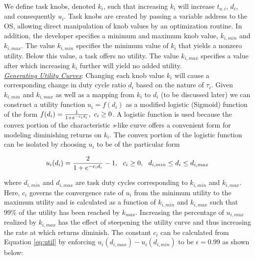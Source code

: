We define task knobs, denoted $k_i$, such that increasing $k_i$ will increase $t_{a,i}$, $d_i$, and consequently $u_i$.  Task knobs are created by passing a variable address to the OS, allowing direct manipulation of knob values by an optimization routine.  In addition, the developer specifies a minimum and maximum knob value, $k_{i,min}$ and $k_{i,max}$. The value $k_{i,min}$ specifies the minimum value of $k_i$ that yields a nonzero utility.  Below this value, a task offers no utility.  The value $k_{i,max}$ specifies a value after which increasing $k_i$ further will yield  no added utility.  \\

\noindent\emph{\underline{Generating Utility Curves}}: Changing each knob value $k_i$ will cause a corresponding change in duty cycle ratio $d_i$ based on the nature of $\tau_i$.  Given $k_{i,min}$ and $k_{i,max}$ as well as a mapping from $k_i$ to $d_i$ (to be discussed later) we can construct a utility function $u_i = f(d_i)$ as a modified logistic (Sigmoid) function of the form $f(d_i) = {1\over{1 + e^{-c_id_i}}}, ~c_i \ge 0$.  A logistic function is used because the convex portion of the characteristic \emph{s}-like curve offers a convenient form for modeling diminishing returns on $k_i$.   The convex portion of the logistic function can be isolated by choosing $u_i$ to be of the particular form

\begin{equation}
\label{eq:util}
u_i(d_i) = { 2\over { 1 + e^{-c_id_i }} }- 1, ~~c_i \ge 0, ~~d_{i,min} \le d_i \le d_{i,max}
\end{equation}

where $d_{i,min}$ and $d_{i,max}$ are task duty cycles corresponding to $k_{i,min}$ and $k_{i,max}$.  Here, $c_i$ governs the convergence rate of $u_i$ from the minimum utility to the maximum utility and is calculated as a function of $k_{i,min}$ and $k_{i,max}$ such that 99\% of the utility has been reached by $k_{max}$.  Increasing the percentage of $u_{i,max}$ realized by $k_{i,max}$ has the effect of steepening the utility curve and thus increasing the rate at which returns diminish. The constant $c_i$ can be calculated from Equation \ref{eq:util} by enforcing $u_i(d_{i,max}) - u_i(d_{i,min})$ to be $\epsilon = 0.99$ as shown below:

